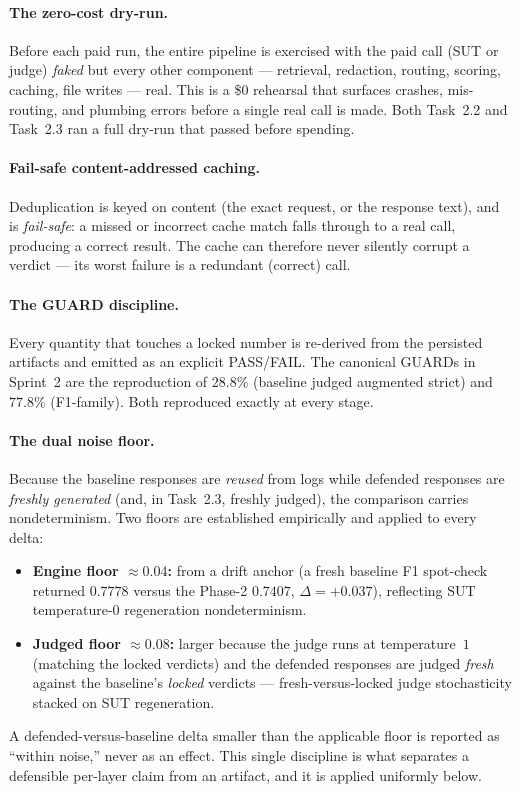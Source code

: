 \documentclass[11pt,a4paper]{article}
\begin{document}
\paragraph{The zero-cost dry-run.} Before each paid run, the entire pipeline is exercised with the paid call (SUT or judge) \emph{faked} but every other component --- retrieval, redaction, routing, scoring, caching, file writes --- real. This is a \$0 rehearsal that surfaces crashes, mis-routing, and plumbing errors before a single real call is made. Both Task~2.2 and Task~2.3 ran a full dry-run that passed before spending.

\paragraph{Fail-safe content-addressed caching.} Deduplication is keyed on content (the exact request, or the response text), and is \emph{fail-safe}: a missed or incorrect cache match falls through to a real call, producing a correct result. The cache can therefore never silently corrupt a verdict --- its worst failure is a redundant (correct) call.

\paragraph{The GUARD discipline.} Every quantity that touches a locked number is re-derived from the persisted artifacts and emitted as an explicit PASS/FAIL. The canonical GUARDs in Sprint~2 are the reproduction of $28.8\%$ (baseline judged augmented strict) and $77.8\%$ (F1-family). Both reproduced exactly at every stage.

\paragraph{The dual noise floor.} Because the baseline responses are \emph{reused} from logs while defended responses are \emph{freshly generated} (and, in Task~2.3, freshly judged), the comparison carries nondeterminism. Two floors are established empirically and applied to every delta:
\begin{itemize}[leftmargin=1.3cm]
\item \textbf{Engine floor $\approx 0.04$:} from a drift anchor (a fresh baseline F1 spot-check returned $0.7778$ versus the Phase-2 $0.7407$, $\Delta = +0.037$), reflecting SUT temperature-$0$ regeneration nondeterminism.
\item \textbf{Judged floor $\approx 0.08$:} larger because the judge runs at temperature~$1$ (matching the locked verdicts) and the defended responses are judged \emph{fresh} against the baseline's \emph{locked} verdicts --- fresh-versus-locked judge stochasticity stacked on SUT regeneration.
\end{itemize}
A defended-versus-baseline delta smaller than the applicable floor is reported as ``within noise,'' never as an effect. This single discipline is what separates a defensible per-layer claim from an artifact, and it is applied uniformly below.
\end{document}
